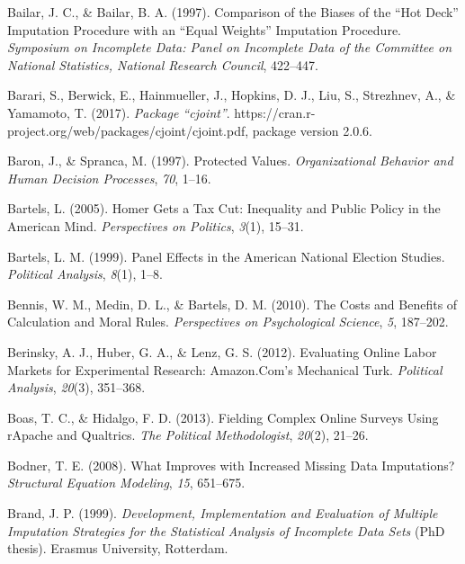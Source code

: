 \documentclass[12pt,econ]{sources/authesis}
\begin{document}
\leavevmode\hypertarget{ref-bailar_1997_comparison}{}%
Bailar, J. C., \& Bailar, B. A. (1997). Comparison of the Biases of the ``Hot Deck'' Imputation Procedure with an ``Equal Weights'' Imputation Procedure. \emph{Symposium on Incomplete Data: Panel on Incomplete Data of the Committee on National Statistics, National Research Council}, 422--447.

\leavevmode\hypertarget{ref-barari_2017_package}{}%
Barari, S., Berwick, E., Hainmueller, J., Hopkins, D. J., Liu, S., Strezhnev, A., \& Yamamoto, T. (2017). \emph{Package ``cjoint''}. https://cran.r-project.org/web/packages/cjoint/cjoint.pdf, package version 2.0.6.

\leavevmode\hypertarget{ref-baron_protected_1997}{}%
Baron, J., \& Spranca, M. (1997). Protected Values. \emph{Organizational Behavior and Human Decision Processes}, \emph{70}, 1--16.

\leavevmode\hypertarget{ref-bartels_2005_homer}{}%
Bartels, L. (2005). Homer Gets a Tax Cut: Inequality and Public Policy in the American Mind. \emph{Perspectives on Politics}, \emph{3}(1), 15--31.

\leavevmode\hypertarget{ref-bartels_1999_panel}{}%
Bartels, L. M. (1999). Panel Effects in the American National Election Studies. \emph{Political Analysis}, \emph{8}(1), 1--8.

\leavevmode\hypertarget{ref-bennis_costs_2010}{}%
Bennis, W. M., Medin, D. L., \& Bartels, D. M. (2010). The Costs and Benefits of Calculation and Moral Rules. \emph{Perspectives on Psychological Science}, \emph{5}, 187--202.

\leavevmode\hypertarget{ref-berinsky_evaluating_2012}{}%
Berinsky, A. J., Huber, G. A., \& Lenz, G. S. (2012). Evaluating Online Labor Markets for Experimental Research: Amazon.Com's Mechanical Turk. \emph{Political Analysis}, \emph{20}(3), 351--368.

\leavevmode\hypertarget{ref-boas_fielding_2013}{}%
Boas, T. C., \& Hidalgo, F. D. (2013). Fielding Complex Online Surveys Using rApache and Qualtrics. \emph{The Political Methodologist}, \emph{20}(2), 21--26.

\leavevmode\hypertarget{ref-bodner_2008_what}{}%
Bodner, T. E. (2008). What Improves with Increased Missing Data Imputations? \emph{Structural Equation Modeling}, \emph{15}, 651--675.

\leavevmode\hypertarget{ref-brand_1999_development}{}%
Brand, J. P. (1999). \emph{Development, Implementation and Evaluation of Multiple Imputation Strategies for the Statistical Analysis of Incomplete Data Sets} (PhD thesis). Erasmus University, Rotterdam.
\end{document}
